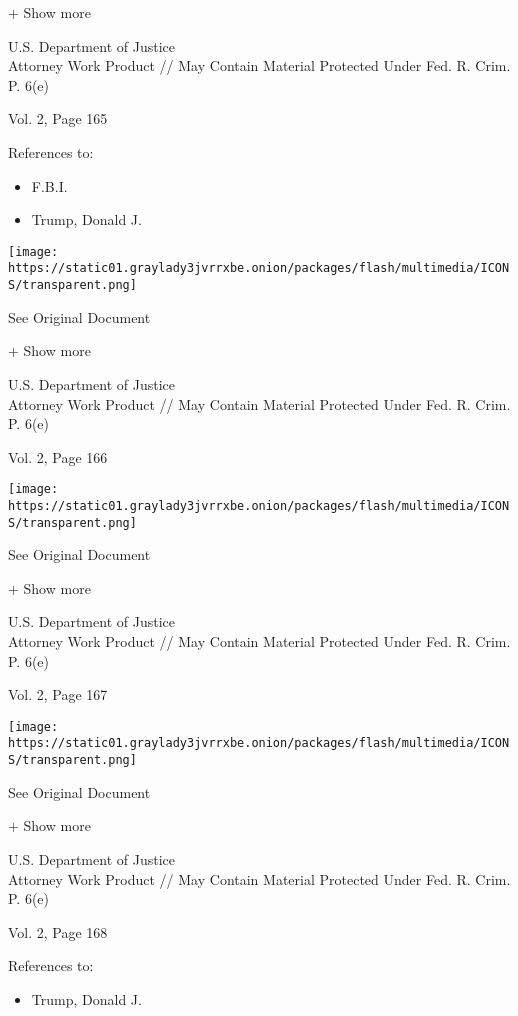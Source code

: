 + Show more

U.S. Department of Justice\\
Attorney Work Product // May Contain Material Protected Under Fed. R.
Crim. P. 6(e)

Vol. 2, Page 165

References to:

\begin{itemize}
\tightlist
\item
  F.B.I.
\item
  Trump, Donald J.
\end{itemize}

\protect\hyperlink{}{}

\texttt{[image: https://static01.graylady3jvrrxbe.onion/packages/flash/multimedia/ICONS/transparent.png]}

See Original Document

+ Show more

U.S. Department of Justice\\
Attorney Work Product // May Contain Material Protected Under Fed. R.
Crim. P. 6(e)

Vol. 2, Page 166

\protect\hyperlink{}{}

\texttt{[image: https://static01.graylady3jvrrxbe.onion/packages/flash/multimedia/ICONS/transparent.png]}

See Original Document

+ Show more

U.S. Department of Justice\\
Attorney Work Product // May Contain Material Protected Under Fed. R.
Crim. P. 6(e)

Vol. 2, Page 167

\protect\hyperlink{}{}

\texttt{[image: https://static01.graylady3jvrrxbe.onion/packages/flash/multimedia/ICONS/transparent.png]}

See Original Document

+ Show more

U.S. Department of Justice\\
Attorney Work Product // May Contain Material Protected Under Fed. R.
Crim. P. 6(e)

Vol. 2, Page 168

References to:

\begin{itemize}
\tightlist
\item
  Trump, Donald J.
\end{itemize}

